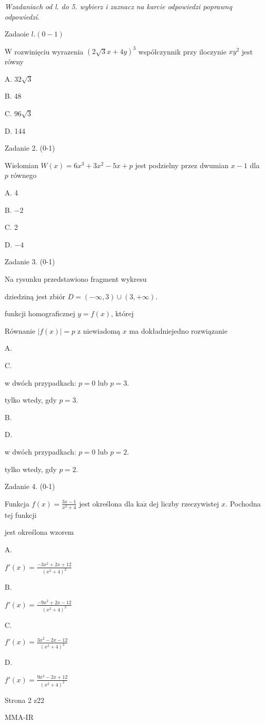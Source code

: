 \documentclass[a4paper,12pt]{article}
\begin{document}
{\it Wzadaniach od l. do 5. wybierz i zaznacz na karcie odpowiedzi poprawnq odpowiedzí}.

Zadaoie $l.(0-1)$

$\mathrm{W}$ rozwinięciu wyrazenia $(2\sqrt{3}x+4y)^{3}$ współczynnik przy iloczynie $xy^{2}$ jest równy

A. $32\sqrt{3}$

B. 48

C. $96\sqrt{3}$

D. 144

Zadanie 2. (0-1)

Wielomian $W(x)=6x^{3}+3x^{2}-5x+p$ jest podzielny przez dwumian $x-1$ dla $p$ równego

A. 4

B. $-2$

C. 2

D. $-4$

Zadanie 3. (0-1)

Na rysunku przedstawiono fragment wykresu

dziedziną jest zbiór $D=(-\infty,3)\cup(3,+\infty).$

funkcji homograficznej $y=f(x)$, której

Równanie $|f(x)|=p$ z niewiadomą $x$ ma dokładniejedno rozwiązanie

A.

C.

w dwóch przypadkach: $p=0$ lub $p=3.$

tylko wtedy, gdy $p=3.$

B.

D.

w dwóch przypadkach: $p=0$ lub $p=2.$

tylko wtedy, gdy $p=2.$

Zadanie 4. (0-1)

Funkcja $f(x)=\displaystyle \frac{3x-1}{x^{2}+4}$ jest określona dla $\mathrm{k}\mathrm{a}\dot{\mathrm{z}}$ dej liczby rzeczywistej $x$. Pochodna tej funkcji

jest określona wzorem

A.

$f'(x)=\displaystyle \frac{-3x^{2}+2x+12}{(x^{2}+4)^{2}}$

B.

$f'(x)=\displaystyle \frac{-9x^{2}+2x-12}{(x^{2}+4)^{2}}$

C.

$f'(x)=\displaystyle \frac{3x^{2}-2x-12}{(x^{2}+4)^{2}}$

D.

$f'(x)=\displaystyle \frac{9x^{2}-2x+12}{(x^{2}+4)^{2}}$

Strona 2 z22

MMA-IR
\end{document}
